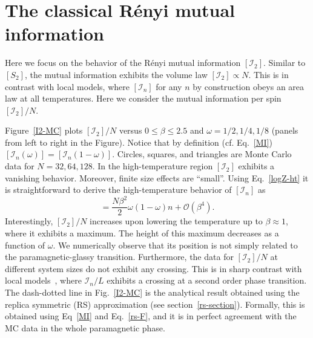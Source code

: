 \documentclass[twocolumn,superscriptaddress,prb,10pt]{revtex4-1}
\begin{document}
\section{The classical R\'enyi mutual information}
\label{I2-section}

Here we focus on the behavior of the R\'enyi mutual information $[{\mathcal I}_2]$. 
Similar to $[S_2]$, the mutual information exhibits the volume law $[{\mathcal I}_2]
\propto N$. This is in contrast with local models, where $[{\mathcal I}_n]$ for any 
$n$ by construction obeys an area law at all temperatures. Here we consider the 
mutual information per spin $[{\mathcal I}_2]/N$. 

Figure~\ref{I2-MC} plots $[{\mathcal I}_2]/N$ versus $0\le\beta\le 2.5$ and $\omega=1/2,1/4,
1/8$ (panels from left to right in the Figure). Notice that by definition (cf. Eq.~\eqref{MI}) 
$[{\mathcal I}_n(\omega)]=[{\mathcal I}_n(1-\omega)]$. Circles, squares, and triangles  
are Monte Carlo data for $N=32,64,128$. In the high-temperature region $[{\mathcal I}_2]$ 
exhibits a vanishing behavior. Moreover, finite size effects are ``small''. Using Eq.~\eqref{logZ-ht} 
it is straightforward to derive the high-temperature behavior of $[{\mathcal I}_n]$ as  
%
\begin{equation}
[{\mathcal I}_n]=\frac{N\beta^2}{2}\omega(1-\omega)n+{\mathcal O}
(\beta^4).
\end{equation}
%
Interestingly, $[{\mathcal I}_2]/N$ increases upon lowering the temperature 
up to $\beta\approx 1$, where it exhibits a maximum. The height of this maximum 
decreases as a function of $\omega$. We numerically observe that its position 
is not simply related to the paramagnetic-glassy transition. Furthermore, the 
data for $[{\mathcal I}_2]/N$ at different system sizes do not exhibit any crossing. This is 
in sharp contrast with local models~\cite{jaconis-2013}, where ${\mathcal I}_n/L$ exhibits a 
crossing at a second order phase transition. The dash-dotted line in Fig.~\ref{I2-MC} is the 
analytical result obtained using the replica symmetric (RS) approximation (see 
section~\ref{rs-section}). Formally, this is obtained using Eq~\eqref{MI} and Eq.~\eqref{rs-F}, 
and it is in perfect agreement with the MC data in the whole paramagnetic phase.  
\end{document}
